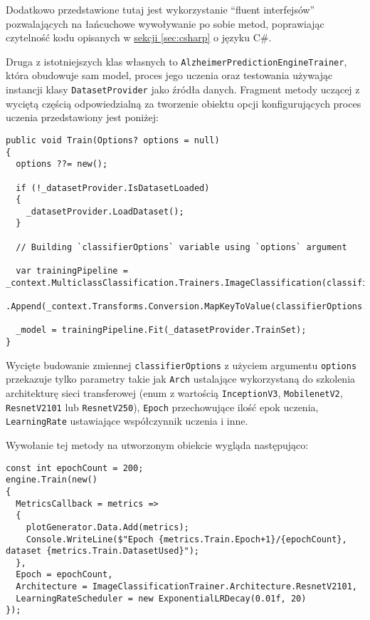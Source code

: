 Dodatkowo przedstawione tutaj jest wykorzystanie ``fluent interfejsów'' pozwalających na łańcuchowe wywoływanie po sobie metod, poprawiając czytelność kodu opisanych w \hyperref[sec:csharp]{sekcji \ref*{sec:csharp}} o języku C\#.

Druga z istotniejszych klas własnych to \lstinline{AlzheimerPredictionEngineTrainer}, która obudowuje sam model, proces jego uczenia oraz testowania używając instancji klasy \lstinline{DatasetProvider} jako źródła danych.
Fragment metody uczącej z wyciętą częścią odpowiedzialną za tworzenie obiektu opcji konfigurujących proces uczenia przedstawiony jest poniżej:

\begin{lstlisting}[language={[Sharp]C}]
public void Train(Options? options = null)
{
  options ??= new();

  if (!_datasetProvider.IsDatasetLoaded)
  {
    _datasetProvider.LoadDataset();
  }

  // Building `classifierOptions` variable using `options` argument

  var trainingPipeline = _context.MulticlassClassification.Trainers.ImageClassification(classifierOptions)
    .Append(_context.Transforms.Conversion.MapKeyToValue(classifierOptions.PredictedLabelColumnName));

  _model = trainingPipeline.Fit(_datasetProvider.TrainSet);
}
\end{lstlisting}

Wycięte budowanie zmiennej \lstinline{classifierOptions} z użyciem argumentu \lstinline{options} przekazuje tylko parametry takie jak \lstinline{Arch} ustalające wykorzystaną do szkolenia architekturę sieci transferowej (enum z wartością \lstinline{InceptionV3}, \lstinline{MobilenetV2}, \lstinline{ResnetV2101} lub \lstinline{ResnetV250}), \lstinline{Epoch} przechowujące ilość epok uczenia, \lstinline{LearningRate} ustawiające współczynnik uczenia i inne.

Wywołanie tej metody na utworzonym obiekcie wygląda następująco:

\begin{lstlisting}[language={[Sharp]C}]
const int epochCount = 200;
engine.Train(new()
{
  MetricsCallback = metrics =>
  {
    plotGenerator.Data.Add(metrics);
    Console.WriteLine($"Epoch {metrics.Train.Epoch+1}/{epochCount}, dataset {metrics.Train.DatasetUsed}");
  },
  Epoch = epochCount,
  Architecture = ImageClassificationTrainer.Architecture.ResnetV2101,
  LearningRateScheduler = new ExponentialLRDecay(0.01f, 20)
});
\end{lstlisting}

